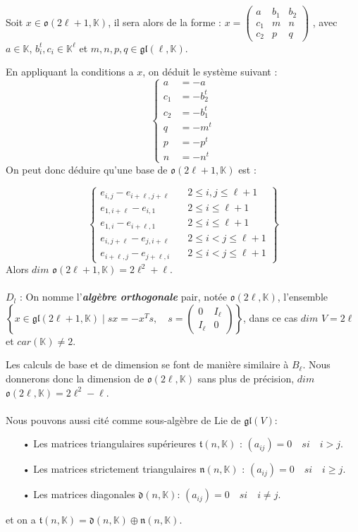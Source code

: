 \documentclass[a4paper,openany,12pt]{report}
\newcommand{\KK}{\mathbb{K}}
\newcommand{\gl}{\mathfrak{gl}}
\newcommand{\ttt}{\mathfrak{t}}
\newcommand{\nn}{\mathfrak{n}}
\newcommand{\dd}{\mathfrak{d}}
\newcommand{\oo}{\mathfrak{o}}
\theoremstyle{break}
{\theorembodyfont{\upshape}
\newtheorem*{rmq}{Remarque :}
\newtheorem*{prv}{Preuve :}
\newtheorem*{ex}{Exemples :}
\newtheorem{exe}{Exemple : }
\newtheorem*{nota}{Notation :}}
\begin{document}
Soit $x \in \oo(2 \ell +1, \KK)$, il sera alors de la forme :
$x = 
\begin{pmatrix}
a & b_{1} & b_{2} \\
c_{1} & m & n \\
c_{2} & p & q 
\end{pmatrix} $
, avec $a \in \KK$, $b_{i}^t,c_{i} \in \KK^{\ell}$ et $m,n,p,q \in \gl(\ell,\KK)$.

En appliquant la conditions a $x$, on déduit le système suivant :
\[ \left \{
\begin{aligned}
a & = -a \\
c_{1} & = -b_{2}^t \\
c_{2} & = -b_{1}^t \\
q & = -m^t \\
p & = -p^t \\
n & = -n^t
\end{aligned}
\right. \]
On peut donc déduire qu'une base de $\oo(2\ell+1,\KK)$ est :

\[ \left \{
\begin{aligned}
e_{i,j}-e_{i+\ell,j+\ell } & \quad 2\leq i,j \leq \ell+1\\
e_{1,i+\ell}-e_{i,1} & \quad 2 \leq i \leq \ell+1 \\
e_{1,i}-e_{i+\ell,1} & \quad 2 \leq i \leq \ell+1 \\ 
e_{i,j+\ell}-e_{j,i+\ell} & \quad 2 \leq i < j \leq \ell+1\\
e_{i+\ell,j}-e_{j+\ell,i} & \quad 2 \leq i < j \leq \ell+1
\end{aligned}
\right \} \]
Alors $dim$ $\oo(2\ell+1,\KK)=2\ell^2+\ell$.\\
\\
$ D_{l} $ : On nomme l'\textbf{\emph{algèbre orthogonale}} pair, notée  $\oo (2\ell,\KK)$, l'ensemble $ \left \{ x \in \gl(2\ell+1, \KK) \mid sx= -x^Ts, \quad s =\begin{pmatrix} 0 & I_\ell \\ I_\ell & 0 \end{pmatrix} \right \}$, dans ce cas $dim$ $V=2 \ell$ et $car(\KK) \ne 2$.

Les calculs de base et de dimension se font de manière similaire à $B_{\ell}$. Nous donnerons donc la dimension de $\oo(2\ell,\KK)$ sans plus de précision, $dim$ $\oo(2\ell,\KK)=2\ell^2-\ell$.\\
\\
\quad Nous pouvons aussi cité comme sous-algèbre de Lie de $\gl(V)$:
\begin{itemize}
\item[•] Les matrices triangulaires supérieures $\ttt(n,\KK)$ : $(a_{ij})= 0  \quad si \quad i>j.$

\item[•] Les matrices strictement  triangulaires  $ \nn(n,\KK) $ : $(a_{ij})= 0  \quad si \quad i \geq j.$

\item[•] Les matrices diagonales $\dd(n,\KK)$: $(a_{ij})= 0  \quad si \quad i \ne j .$
\end{itemize}
et on a $\ttt(n,\KK)=\dd(n,\KK) \oplus \nn(n,\KK)$.
\end{document}
